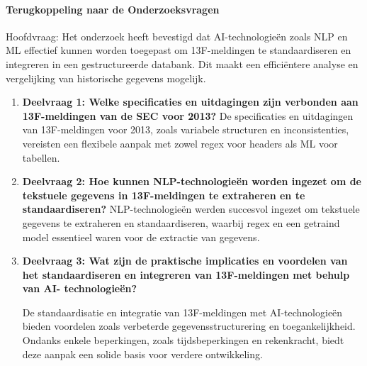 \paragraph{Terugkoppeling naar de Onderzoeksvragen}
Hoofdvraag: Het onderzoek heeft bevestigd dat AI-technologieën zoals NLP en ML effectief kunnen worden toegepast om 13F-meldingen te standaardiseren en integreren in een gestructureerde databank. Dit maakt een efficiëntere analyse en vergelijking van historische gegevens mogelijk.
\begin{enumerate}
 \item \textbf{Deelvraag 1: Welke specificaties en uitdagingen zijn verbonden aan 13F-meldingen van de SEC voor 2013?}
 De specificaties en uitdagingen van 13F-meldingen voor 2013, zoals variabele structuren en inconsistenties, vereisten een flexibele aanpak met zowel regex voor headers als ML voor tabellen.

\item \textbf{Deelvraag 2: Hoe kunnen NLP-technologieën worden ingezet om de tekstuele gegevens in 13F-meldingen te extraheren en te standaardiseren?}
NLP-technologieën werden succesvol ingezet om tekstuele gegevens te extraheren en standaardiseren, waarbij regex en een getraind model essentieel waren voor de extractie van gegevens.

 \item \textbf{Deelvraag 3: Wat zijn de praktische implicaties en voordelen van het standaardiseren en integreren van 13F-meldingen met behulp van AI- technologieën?}

 De standaardisatie en integratie van 13F-meldingen met AI-technologieën bieden voordelen zoals verbeterde gegevensstructurering en toegankelijkheid. Ondanks enkele beperkingen, zoals tijdsbeperkingen en rekenkracht, biedt deze aanpak een solide basis voor verdere ontwikkeling.
\end{enumerate}


